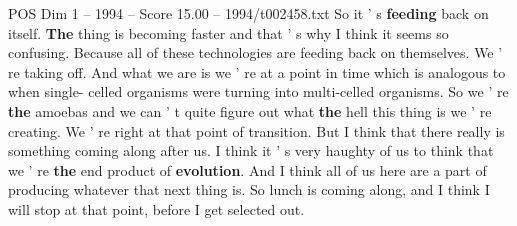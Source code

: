 \begin{textsample}{POS Dim 1 – 1994 – Score 15.00 – 1994/t002458.txt}
So it ' s \textbf{feeding} back on itself. \textbf{The} thing is becoming faster and that ' s why I think it seems so confusing.
Because all of these technologies are feeding back on themselves.
We ' re taking off.
And what we are is we ' re at a point in time which is analogous to when single- celled organisms were turning into multi-celled organisms.
So we ' re \textbf{the} amoebas and we can ' t quite figure out what \textbf{the} hell this thing is we ' re creating.
We ' re right at that point of transition.
But I think that there really is something coming along after us.
I think it ' s very haughty of us to think that we ' re \textbf{the} end product of \textbf{evolution}.
And I think all of us here are a part of producing whatever that next thing is.
So lunch is coming along, and I think I will stop at that point, before I get selected out.

\end{textsample}
